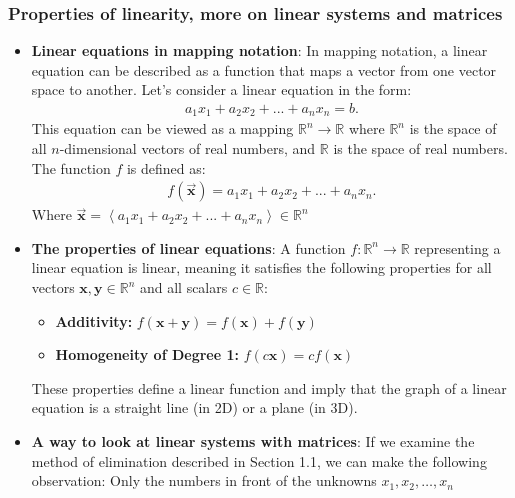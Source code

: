 \documentclass{report}
\begin{document}
    \subsubsection{Properties of linearity, more on linear systems and matrices}
    \begin{itemize}
                \item \textbf{Linear equations in mapping notation}:
            In mapping notation, a linear equation can be described as a function that maps a vector from one vector space to another. Let's consider a linear equation in the form:
            \begin{align*}
                a_{1}x_{1} + a_{2}x_{2} + ... + a_{n}x_{n} = b
            .\end{align*}
            \bigbreak \noindent 
            This equation can be viewed as a mapping $\mathbb{R}^{n} \to \mathbb{R}$ where $\mathbb{R}^{n}$ is the space of all $n$-dimensional vectors of real numbers, and $\mathbb{R}$ is the space of real numbers. The function $f$ is defined as:
            \begin{align*}
                f(\vec{\mathbf{x}}) =  a_{1}x_{1} + a_{2}x_{2} + ... + a_{n}x_{n}
            .\end{align*}
             Where $\vec{\mathbf{x}} = \left\langle a_{1}x_{1} + a_{2}x_{2} + ... + a_{n}x_{n} \right\rangle \in \mathbb{R}^{n}$
         \item \textbf{The properties of linear equations}:
             A function \( f: \mathbb{R}^n \rightarrow \mathbb{R} \) representing a linear equation is linear, meaning it satisfies the following properties for all vectors \( \mathbf{x}, \mathbf{y} \in \mathbb{R}^n \) and all scalars \( c \in \mathbb{R} \):
             \begin{itemize}
                 \item \textbf{Additivity:} \( f(\mathbf{x} + \mathbf{y}) = f(\mathbf{x}) + f(\mathbf{y}) \)
                 \item \textbf{Homogeneity of Degree 1:} \( f(c\mathbf{x}) = cf(\mathbf{x}) \)
             \end{itemize}
             These properties define a linear function and imply that the graph of a linear equation is a straight line (in 2D) or a plane (in 3D).
         \item \textbf{A way to look at linear systems with matrices}:
             If we examine the method of elimination described in Section 1.1, we can make the 
             following observation: Only the numbers in front of the unknowns $x_1, x_2, \ldots, x_n$ 

\end{itemize}
\end{document}
